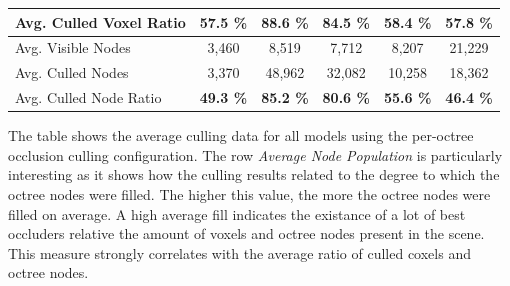 \begin{table}[h]
\begin{tabular}{|lccccc|}
  \multicolumn{1}{|l|}{Avg. Culled Voxel Ratio}   & \multicolumn{1}{c|}{\textbf{57.5 \%}}         & \multicolumn{1}{c|}{\textbf{88.6 \%}}         & \multicolumn{1}{c|}{\textbf{84.5 \%}} & \multicolumn{1}{c|}{\textbf{58.4 \%}}     & \multicolumn{1}{c|}{\textbf{57.8 \%}}     \\ \hline
  \multicolumn{1}{|l|}{Avg. Visible Nodes}        & \multicolumn{1}{c|}{3,460}                    & \multicolumn{1}{c|}{8,519}                    & \multicolumn{1}{c|}{7,712}            & \multicolumn{1}{c|}{8,207}                & \multicolumn{1}{c|}{21,229}               \\
  \multicolumn{1}{|l|}{Avg. Culled Nodes}         & \multicolumn{1}{c|}{3,370}                    & \multicolumn{1}{c|}{48,962}                   & \multicolumn{1}{c|}{32,082}           & \multicolumn{1}{c|}{10,258}               & \multicolumn{1}{c|}{18,362}               \\
  \multicolumn{1}{|l|}{Avg. Culled Node Ratio}    & \multicolumn{1}{c|}{\textbf{49.3 \%}}         & \multicolumn{1}{c|}{\textbf{85.2 \%}}         & \multicolumn{1}{c|}{\textbf{80.6 \%}} & \multicolumn{1}{c|}{\textbf{55.6 \%}}     & \multicolumn{1}{c|}{\textbf{46.4 \%}}     \\ \hline
  
  \end{tabular}
\end{table}

\noindent
The table shows the average culling data for all models using the per-octree occlusion culling configuration.
The row \emph{Average Node Population} is particularly interesting as it shows how the culling results related 
to the degree to which the octree nodes were filled. The higher this value, the more the octree nodes were filled 
on average. A high average fill indicates the existance of a lot of best occluders relative the amount of voxels 
and octree nodes present in the scene. This measure strongly correlates with the average ratio of culled coxels and 
octree nodes. \\



